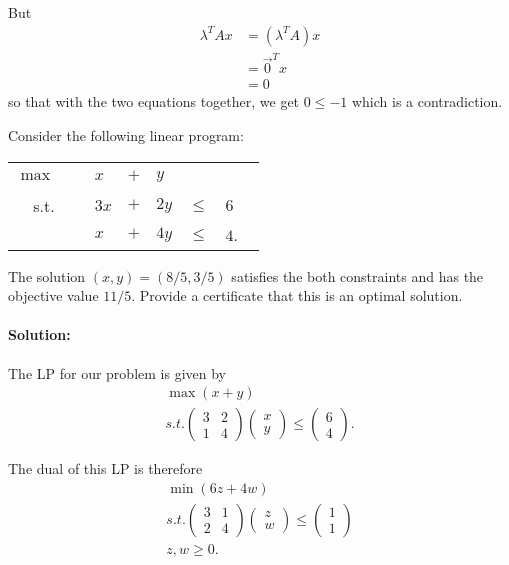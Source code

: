 \documentclass[11pt]{article}
\begin{document}
But 
\begin{align*}
\lambda^TAx & = (\lambda^TA)x \\
& = \vec{0}^Tx \\
& = 0
\end{align*}
so that with the two equations together, we get $0 \leq -1$ which is a contradiction. 

 
 
 
\problem Consider the following linear program:
\begin{center}
\begin{tabular}{rllllll}
$\max$ & \ & $x$ & $+$ & $y$ & \ & \\ 
s.t. & \ & $3x$ & $+$ & $2y$ & $\leq$ & $6$ \\ 
\ & \ & $x$ & $+$ & $4y$ & $\leq$ & $4$. \
\end{tabular} 
\end{center} 
The solution $(x, y)=(8/5 , 3/5)$ satisfies the both constraints and has the objective value $11/5$. Provide a certificate that this is an optimal solution.


\paragraph{Solution:}
The LP for our problem is given by 
\begin{align*}
\max (x + y) \\
s.t. \begin{pmatrix}  3 & 2 \\ 1 & 4 \end{pmatrix} \begin{pmatrix} x \\ y \end{pmatrix} \leq \begin{pmatrix} 6 \\ 4 \end{pmatrix}.
\end{align*}

The dual of this LP is therefore 
\begin{align*}
\min (6z + 4w) \\
s.t. \begin{pmatrix}  3 & 1 \\ 2 & 4 \end{pmatrix} \begin{pmatrix} z \\ w \end{pmatrix} \leq \begin{pmatrix} 1 \\ 1 \end{pmatrix}\\
z, w \geq 0.
\end{align*}
\end{document}
